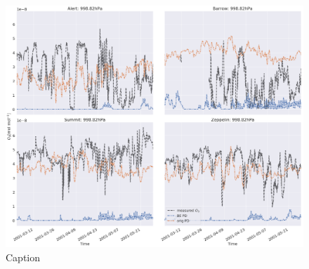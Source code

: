 \begin{figure}
    \centering
    \includegraphics[width = \linewidth]{Chapter6_Results/images/ozone_2001_compObsOrigBE.png}
    \caption{Caption}
    \label{fig:CompObsOrigBE}
\end{figure}